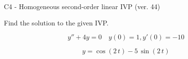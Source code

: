 \begin{exercise}
  \begin{exerciseTitle}C4 - Homogeneous second-order linear IVP (ver. 44)\end{exerciseTitle}
  \begin{exerciseStatement}
    
Find the solution to the given IVP.

    
\[y''+4y = 0 \hspace{1em} y(0) = 1 , y'(0) = -10\]

  \end{exerciseStatement}
  \begin{exerciseAnswer}
    
\[y= \cos\left(2 \, t\right) - 5 \, \sin\left(2 \, t\right)\]

  \end{exerciseAnswer}
\end{exercise}